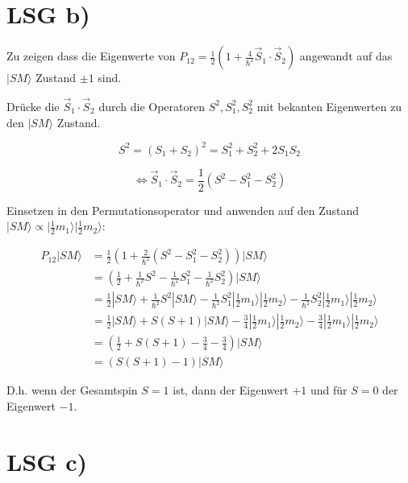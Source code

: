 \section*{LSG b)}

Zu zeigen dass die Eigenwerte von \(P_{12}= \frac{1}{2}\left( 1+\frac{4}{\hbar^2}\vec S_1\cdot \vec S_2\right) \) angewandt auf das \(|SM\rangle \) Zustand \(\pm 1\) sind. 

Drücke die \(\vec S_1\cdot \vec S_2 \) durch die Operatoren \(S^2,S_1^2,S_2^2\)  mit bekanten Eigenwerten zu den \(|SM\rangle \) Zustand. 

\[S^2 = (S_1+S_2)^2 = S_1^2+S_2^2+2S_1S_2\]  

\[\Leftrightarrow  \vec S_1\cdot \vec S_2 = \frac{1}{2}(S^2-S_1^2-S_2^2) \]

Einsetzen in den Permutationsoperator und anwenden auf den Zustand \(|SM\rangle \propto |\frac{1}{2} m_1\rangle |\frac{1}{2} m_2\rangle \):

\begin{align}
P_{12}|SM\rangle  &= \frac{1}{2}\left( 1+\frac{2}{\hbar^2} (S^2-S_1^2-S_2^2)  \right)|SM\rangle   \\
&= (\frac{1}{2}+\frac{1}{\hbar^2} S^2- \frac{1}{\hbar^2}S_1^2-\frac{1}{\hbar^2}S_2^2) |SM\rangle   \\
&= \frac{1}{2}|SM\rangle +\frac{1}{\hbar^2} S^2|SM\rangle - \frac{1}{\hbar^2}S_1^2|\frac{1}{2} m_1\rangle |\frac{1}{2} m_2\rangle  - \frac{1}{\hbar^2}S_2^2|\frac{1}{2} m_1\rangle|\frac{1}{2} m_2\rangle  \\
&= \frac{1}{2}|SM\rangle + S(S+1) |SM\rangle - \frac{3}{4}|\frac{1}{2} m_1\rangle |\frac{1}{2} m_2\rangle  - \frac{3}{4}|\frac{1}{2} m_1\rangle|\frac{1}{2} m_2\rangle  \\
&= (\frac{1}{2} + S(S+1) - \frac{3}{4}  - \frac{3}{4} ) |SM\rangle  \\
&= (S(S+1) - 1 ) |SM\rangle 
\end{align}

D.h. wenn der Gesamtspin \(S=1\) ist, dann der Eigenwert \(+1\) und für \(S=0\) der Eigenwert \(-1\).


\section*{LSG c)}






